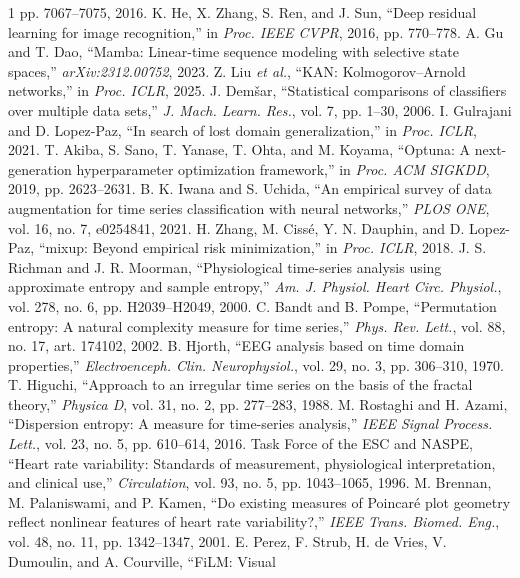 \documentclass[journal]{IEEEtran}
\begin{document}
\begin{thebibliography}{1}
pp. 7067--7075, 2016.
 K. He, X. Zhang, S. Ren, and J. Sun, ``Deep residual learning for image
recognition,'' in \emph{Proc. IEEE CVPR}, 2016, pp. 770--778.
 A. Gu and T. Dao, ``Mamba: Linear-time sequence modeling with selective state
spaces,'' \emph{arXiv:2312.00752}, 2023.
 Z. Liu \emph{et al.}, ``KAN: Kolmogorov--Arnold networks,'' in \emph{Proc. ICLR},
2025.
 J. Demšar, ``Statistical comparisons of classifiers over multiple data sets,''
\emph{J. Mach. Learn. Res.}, vol. 7, pp. 1--30, 2006.
 I. Gulrajani and D. Lopez-Paz, ``In search of lost domain generalization,'' in
\emph{Proc. ICLR}, 2021.
 T. Akiba, S. Sano, T. Yanase, T. Ohta, and M. Koyama, ``Optuna: A next-generation
hyperparameter optimization framework,'' in \emph{Proc. ACM SIGKDD}, 2019, pp. 2623--2631.
 B. K. Iwana and S. Uchida, ``An empirical survey of data augmentation for time
series classification with neural networks,'' \emph{PLOS ONE}, vol. 16, no. 7, e0254841, 2021.
 H. Zhang, M. Cissé, Y. N. Dauphin, and D. Lopez-Paz, ``mixup: Beyond empirical
risk minimization,'' in \emph{Proc. ICLR}, 2018.
 J. S. Richman and J. R. Moorman, ``Physiological time-series analysis using
approximate entropy and sample entropy,'' \emph{Am. J. Physiol. Heart Circ. Physiol.}, vol. 278, no. 6,
pp. H2039--H2049, 2000.
 C. Bandt and B. Pompe, ``Permutation entropy: A natural complexity measure for time
series,'' \emph{Phys. Rev. Lett.}, vol. 88, no. 17, art. 174102, 2002.
 B. Hjorth, ``EEG analysis based on time domain properties,'' \emph{Electroenceph.
Clin. Neurophysiol.}, vol. 29, no. 3, pp. 306--310, 1970.
 T. Higuchi, ``Approach to an irregular time series on the basis of the fractal
theory,'' \emph{Physica D}, vol. 31, no. 2, pp. 277--283, 1988.
 M. Rostaghi and H. Azami, ``Dispersion entropy: A measure for time-series
analysis,'' \emph{IEEE Signal Process. Lett.}, vol. 23, no. 5, pp. 610--614, 2016.
 Task Force of the ESC and NASPE, ``Heart rate variability: Standards of measurement,
physiological interpretation, and clinical use,'' \emph{Circulation}, vol. 93, no. 5, pp. 1043--1065, 1996.
 M. Brennan, M. Palaniswami, and P. Kamen, ``Do existing measures of Poincar\'e plot
geometry reflect nonlinear features of heart rate variability?,'' \emph{IEEE Trans. Biomed. Eng.}, vol.
48, no. 11, pp. 1342--1347, 2001.
 E. Perez, F. Strub, H. de Vries, V. Dumoulin, and A. Courville, ``FiLM: Visual

\end{thebibliography}
\end{document}
